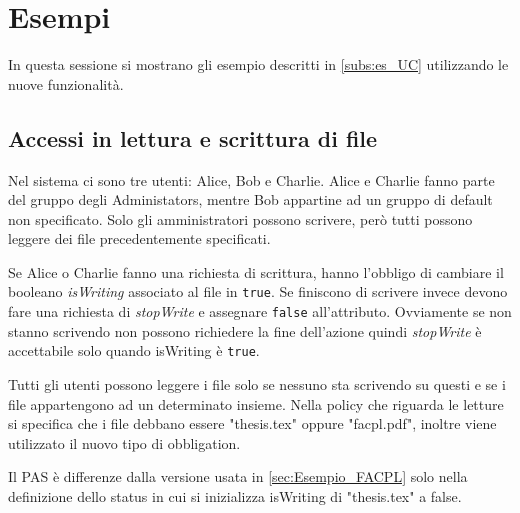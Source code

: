 \section{Esempi}
\label{sec:Esempi}
In questa sessione si mostrano gli esempio descritti in \ref{subs:es_UC} utilizzando le nuove funzionalità.
\subsection{Accessi in lettura e scrittura di file}
\label{sub:RW_Code_Sec}
Nel sistema ci sono tre utenti: Alice, Bob e Charlie. Alice e Charlie fanno parte del gruppo degli Administators,
mentre Bob appartine ad un gruppo di default non specificato. Solo gli amministratori possono scrivere,
però tutti possono leggere dei file precedentemente specificati.

Se Alice o Charlie fanno una richiesta di scrittura, hanno l'obbligo di cambiare il booleano \emph{isWriting} associato al file in \texttt{true}.
Se finiscono di scrivere invece devono fare una richiesta di \emph{stopWrite} e assegnare \texttt{false} all'attributo.
Ovviamente se non stanno scrivendo non possono richiedere la fine dell'azione quindi \emph{stopWrite} è accettabile solo quando
isWriting è \texttt{true}.

Tutti gli utenti possono leggere i file solo se nessuno sta scrivendo su questi e
se i file appartengono ad un determinato insieme. Nella policy che riguarda le letture si specifica che i
file debbano essere "thesis.tex" oppure "facpl.pdf", inoltre viene utilizzato il nuovo tipo di obbligation.

Il \ac{PAS} è differenze dalla versione usata in \ref{sec:Esempio_FACPL} solo nella definizione dello status
in cui si inizializza isWriting di "thesis.tex" a false.

